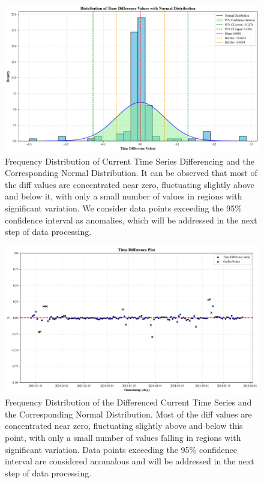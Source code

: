 \begin{figure}[H]
	\centering
	\includegraphics[width=\linewidth]{figures/No.3_Diff_and_Normal_Distribution} 
	\caption{Frequency Distribution of Current Time Series Differencing and the Corresponding Normal Distribution. It can be observed that most of the diff values are concentrated near zero, fluctuating slightly above and below it, with only a small number of values in regions with significant variation. We consider data points exceeding the 95\% confidence interval as anomalies, which will be addressed in the next step of data processing.}
	\label{fig:No.3_Diff_and_Normal_Distribution}
\end{figure}


\begin{figure}[H]
	\centering
	\includegraphics[width=\linewidth]{figures/No.3_Abnormal_Value} 
	\caption{Frequency Distribution of the Differenced Current Time Series and the Corresponding Normal Distribution. Most of the diff values are concentrated near zero, fluctuating slightly above and below this point, with only a small number of values falling in regions with significant variation. Data points exceeding the 95\% confidence interval are considered anomalous and will be addressed in the next step of data processing.}

	\label{fig:No.3_Abnormal_Value}
\end{figure}

